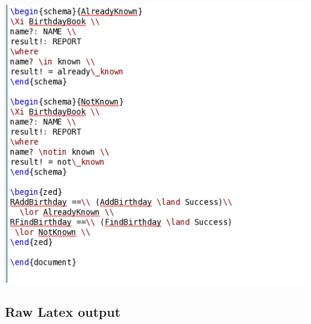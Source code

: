 \noindent \includegraphics[scale=0.5]{examples/bb/0imageb.png}

\subsection{Raw Latex output}
\label{app:bb0o}

